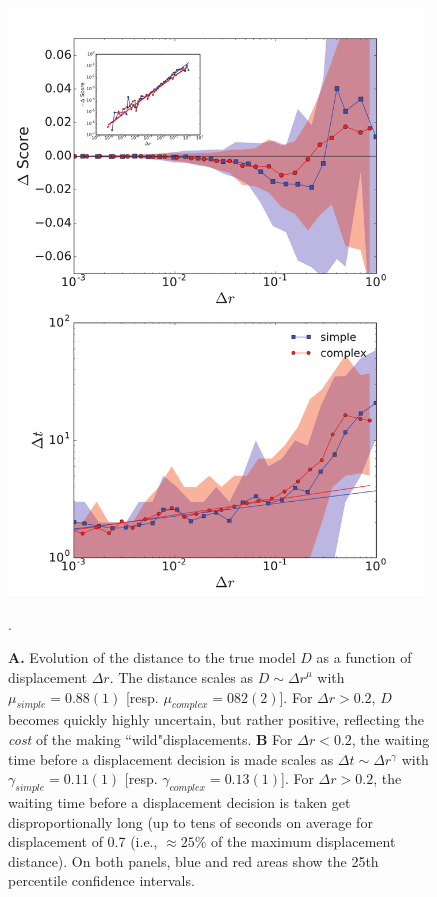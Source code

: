 \begin{figure}[h!]
\begin{center}
\includegraphics[width=11cm]{figures/vs_dr.pdf}
\caption{{\bf A.} Evolution of the distance to the true model $D$ as a function of displacement $\Delta r$. The distance scales as $D \sim {\Delta r}^{\mu}$ with $\mu_{simple} = 0.88(1)$ [resp. $\mu_{complex} = 082(2)$]. For $\Delta r > 0.2$, $D$ becomes quickly highly uncertain, but rather positive, reflecting the {\it cost} of the making ``wild"displacements. {\bf B} For $\Delta r < 0.2$, the waiting time before a displacement decision is made scales as $\Delta t \sim \Delta r^{\gamma}$ with $\gamma_{simple} = 0.11(1)$ [resp. $\gamma_{complex} = 0.13(1)$]. For $\Delta r > 0.2$, the waiting time before a displacement decision is taken get disproportionally long (up to tens of seconds on average for displacement of 0.7 (i.e., $\approx 25\%$ of the maximum displacement distance). On both panels, blue and red areas show the 25th percentile confidence intervals.}.
\label{fig:vs_dr}
\end{center}
\end{figure}


